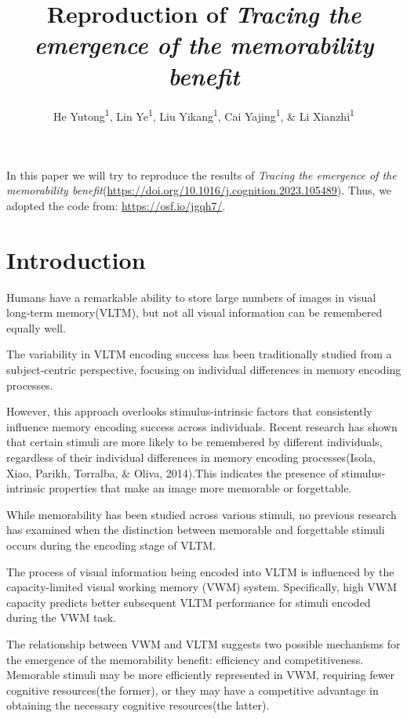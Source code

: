\documentclass[
  man]{apa6}
\title{Reproduction of \emph{Tracing the emergence of the memorability benefit}}
\author{He Yutong\textsuperscript{1}, Lin Ye\textsuperscript{1}, Liu Yikang\textsuperscript{1}, Cai Yajing\textsuperscript{1}, \& Li Xianzhi\textsuperscript{1}}
\date{}
\affiliation{\vspace{0.5cm}\textsuperscript{1} Nanjing Normal Unviersity}
\begin{document}
\maketitle

In this paper we will try to reproduce the results of \emph{Tracing the emergence of the memorability benefit}(\url{https://doi.org/10.1016/j.cognition.2023.105489}). Thus, we adopted the code from: \url{https://osf.io/jgqh7/}.

\hypertarget{introduction}{%
\section{Introduction}\label{introduction}}

Humans have a remarkable ability to store large numbers of images in visual long-term memory(VLTM), but not all visual information can be remembered equally well.

The variability in VLTM encoding success has been traditionally studied from a subject-centric perspective, focusing on individual differences in memory encoding processes.

However, this approach overlooks stimulus-intrinsic factors that consistently influence memory encoding success across individuals. Recent research has shown that certain stimuli are more likely to be remembered by different individuals, regardless of their individual differences in memory encoding processes(Isola, Xiao, Parikh, Torralba, \& Oliva, 2014).This indicates the presence of stimulus-intrinsic properties that make an image more memorable or forgettable.

While memorability has been studied across various stimuli, no previous research has examined when the distinction between memorable and forgettable stimuli occurs during the encoding stage of VLTM.

The process of visual information being encoded into VLTM is influenced by the capacity-limited visual working memory (VWM) system. Specifically, high VWM capacity predicts better subsequent VLTM performance for stimuli encoded during the VWM task.

The relationship between VWM and VLTM suggests two possible mechanisms for the emergence of the memorability benefit: efficiency and competitiveness. Memorable stimuli may be more efficiently represented in VWM, requiring fewer cognitive resources(the former), or they may have a competitive advantage in obtaining the necessary cognitive resources(the latter).
\end{document}
